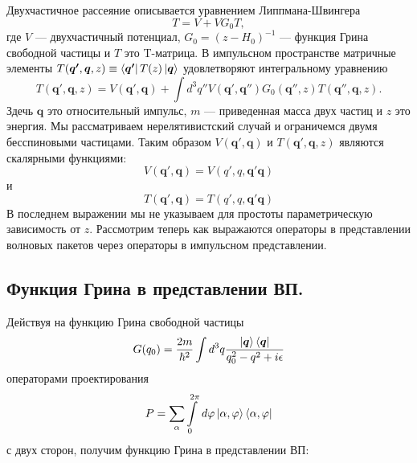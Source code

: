 \documentclass[a4paper,12pt]{article}
\newcommand{\vect}[1]{\boldsymbol{#1}}
\begin{document}
Двухчастичное рассеяние описывается уравнением Липпмана-Швингера\cite{sakurai}
\begin{equation}
    T = V + V G_0 T,
\end{equation}
где $V$ — двухчастичный потенциал, $G_0 = (z - H_0)^{-1}$ — функция Грина свободной частицы и $T$ это T-матрица. В импульсном пространстве матричные элементы $T(\vect{q'},\vect{q},z) \equiv \bra{\vect{q'}}T(z)\ket{\vect{q}}$  удовлетворяют интегральному уравнению
\begin{equation}
    T(\vect{q'},\vect{q}, z) = V(\vect{q'},\vect{q}) + \int d^3q'' V(\vect{q'},\vect{q''}) G_0(\vect{q''},z) T(\vect{q''},\vect{q}, z). 
\end{equation}
Здечь $\vect{q}$ это относительный импульс, $m$ — приведенная масса двух частиц и $z$ это энергия. Мы рассматриваем нерелятивистский случай и ограничемся двумя бесспиновыми частицами. Таким образом $V(\vect{q'},\vect{q})$ и $T(\vect{q'},\vect{q},z)$ являются скалярными функциями:
\begin{equation}
    V(\vect{q'},\vect{q}) = V(q',q,\vect{q'}\vect{q})
\end{equation}
и
\begin{equation}
    T(\vect{q'},\vect{q}) = T(q',q,\vect{q'}\vect{q})
\end{equation}
В последнем выражении мы не указываем для простоты параметрическую зависимость от $z$. Рассмотрим теперь как выражаются операторы в представлении волновых пакетов через операторы в импульсном представлении.

\newline
\subsection{Функция Грина в представлении ВП.}
Действуя на функцию Грина свободной частицы
\[
	G(q_0) = \frac{2m}{\hbar^2} \int d^3q \frac{ \ket{\vect{q}} \bra{ \vect{q} } }{ q_0^2 - q^2 + i\epsilon } 
\]
операторами проектирования
\[
	P = \sum\limits_\alpha \int\limits_0^{2\pi} \,d \varphi \ket{\alpha,\varphi}\bra{\alpha,\varphi}
\] 
с двух сторон, получим функцию Грина в представлении ВП:
\end{document}
